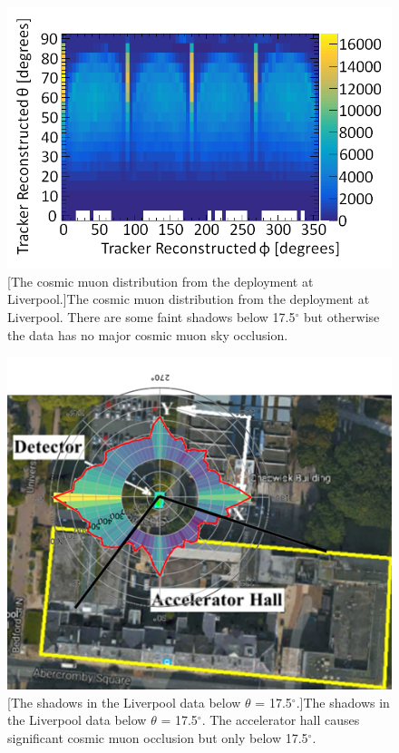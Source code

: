 \begin{figure}[!h]
\centering
\begin{minipage}{.45\textwidth}
  \centering
  \includegraphics[width=\linewidth]{Chapter6/Figs/Raster/pVsTLiverpoolReversedMedText.png}
  [The cosmic muon distribution from the deployment at Liverpool.]{The cosmic muon distribution from the deployment at Liverpool. There are some faint shadows below 17.5$^\circ$ but otherwise the data has no major cosmic muon sky occlusion.} 
  \label{fig:pVsTLiverpoolReversed}
\end{minipage}%
\qquad
\begin{minipage}{.45\textwidth}
  \centering
  \includegraphics[width=\linewidth]{Chapter5/Figs/Raster/liverpoolShadows.png}
  [The shadows in the Liverpool data below $\theta$ =  17.5$^\circ$.]{The shadows in the Liverpool data below $\theta$ =  17.5$^\circ$. The accelerator hall causes significant cosmic muon occlusion but only below 17.5$^\circ$.}
  \label{fig:liverpoolShadows}
  \vspace{1.248cm} %
\end{minipage}
\end{figure}

